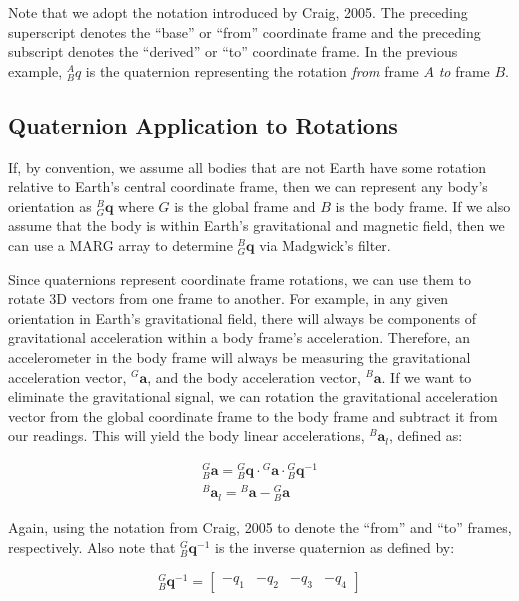Note that we adopt the notation introduced by Craig, 2005. 
The preceding superscript denotes the ``base'' or ``from'' coordinate frame and the preceding subscript denotes the ``derived'' or ``to'' coordinate frame. 
In the previous example, ${}_B^Aq$ is the quaternion representing the rotation \textit{from} frame $A$ \textit{to} frame $B$.

\subsection{Quaternion Application to Rotations}

If, by convention, we assume all bodies that are not Earth have some rotation relative to Earth’s central coordinate frame, then we can represent any body’s orientation as ${}^B_G\pmb{q}$ where $G$ is the global frame and $B$ is the body frame. 
If we also assume that the body is within Earth’s gravitational and magnetic field, then we can use a MARG array to determine ${}^B_G\pmb{q}$ via Madgwick’s filter.

Since quaternions represent coordinate frame rotations, we can use them to rotate 3D vectors from one frame to another. 
For example, in any given orientation in Earth’s gravitational field, there will always be components of gravitational acceleration within a body frame’s acceleration. 
Therefore, an accelerometer in the body frame will always be measuring the gravitational acceleration vector, ${}^G\pmb{a}$, and the body acceleration vector, ${}^B\pmb{a}$. 
If we want to eliminate the gravitational signal, we can rotation the gravitational acceleration vector from the global coordinate frame to the body frame and subtract it from our readings. 
This will yield the body linear accelerations, ${}^B\pmb{a}_l$, defined as:

\begin{gather}
    {}^G_B\pmb{a} = {}^G_B\pmb{q} \cdot {}^G\pmb{a} \cdot {}^G_B\pmb{q}^{-1} \\
    {}^B\pmb{a}_l = {}^B\pmb{a} - {}^G_B\pmb{a}
\end{gather}

Again, using the notation from Craig, 2005 to denote the ``from'' and ``to'' frames, respectively. Also note that ${}^G_B\pmb{q}^{-1}$ is the inverse quaternion as defined by:

\begin{equation*}
    {}^G_B\pmb{q}^{-1} = \begin{bmatrix} -q_1 & -q_2 & -q_3 & -q_4 \end{bmatrix}
\end{equation*}

